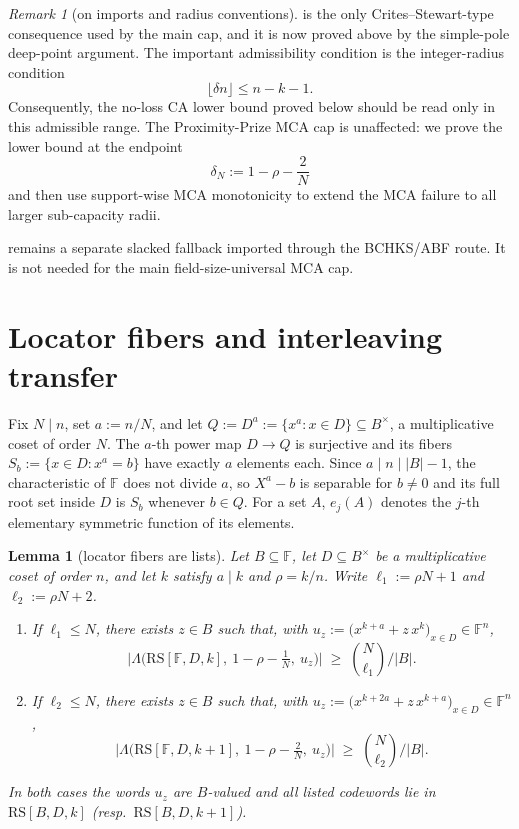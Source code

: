 \documentclass[11pt]{article}
\newtheorem{lemma}[theorem]{Lemma}
\theoremstyle{definition}
\theoremstyle{remark}
\newtheorem{remark}[theorem]{Remark}
\newcommand{\F}{\mathbb{F}}
\newcommand{\B}{B}
\newcommand{\RS}{\mathrm{RS}}
\newcommand{\Lst}{\Lambda}
\begin{document}
\begin{remark}[on imports and radius conventions]\label{rem:import}
 is the only Crites--Stewart-type consequence used by the main cap, and it is now proved above by the simple-pole deep-point argument.  The important admissibility condition is the integer-radius condition
\[
        \lfloor \delta n\rfloor \le n-k-1 .
\]
Consequently, the no-loss CA lower bound proved below should be read only in this admissible range. The Proximity-Prize MCA cap is unaffected: we prove the lower bound at the endpoint
\[
        \delta_N:=1-\rho-\frac2N
\]
and then use support-wise MCA monotonicity to extend the MCA failure to all larger sub-capacity radii.

 remains a separate slacked fallback imported through the BCHKS/ABF route. It is not needed for the main field-size-universal MCA cap.
\end{remark}

\section{Locator fibers and interleaving transfer}\label{sec:fiber}

Fix $N\mid n$, set $a:=n/N$, and let $Q:=D^{a}:=\{x^a:x\in D\}\subseteq\B^\times$, a multiplicative coset of order $N$. The $a$-th power map $D\to Q$ is surjective and its fibers $S_b:=\{x\in D:x^a=b\}$ have exactly $a$ elements each. Since $a\mid n\mid|\B|-1$, the characteristic of $\F$ does not divide $a$, so $X^a-b$ is separable for $b\ne0$ and its full root set inside $D$ is $S_b$ whenever $b\in Q$. For a set $A$, $e_j(A)$ denotes the $j$-th elementary symmetric function of its elements.

\begin{lemma}[locator fibers are lists]\label{lem:fiber}
Let $\B\subseteq\F$, let $D\subseteq\B^\times$ be a multiplicative coset of order $n$, and let $k$ satisfy $a\mid k$ and $\rho=k/n$. Write $\ell_1:=\rho N+1$ and $\ell_2:=\rho N+2$.
\begin{enumerate}[label=\textup{(\roman*)}]
\item If $\ell_1\le N$, there exists $z\in\B$ such that, with $u_z:=\bigl(x^{k+a}+z\,x^{k}\bigr)_{x\in D}\in\F^n$,
\[
\bigl|\Lst\bigl(\RS[\F,D,k],\ 1-\rho-\tfrac1N,\ u_z\bigr)\bigr|\;\ge\;\binom{N}{\ell_1}\Big/|\B| .
\]
\item If $\ell_2\le N$, there exists $z\in\B$ such that, with $u_z:=\bigl(x^{k+2a}+z\,x^{k+a}\bigr)_{x\in D}\in\F^n$,
\[
\bigl|\Lst\bigl(\RS[\F,D,k+1],\ 1-\rho-\tfrac2N,\ u_z\bigr)\bigr|\;\ge\;\binom{N}{\ell_2}\Big/|\B| .
\]
\end{enumerate}
In both cases the words $u_z$ are $\B$-valued and all listed codewords lie in $\RS[\B,D,k]$ \textup(resp.\ $\RS[\B,D,k+1]$\textup).
\end{lemma}
\end{document}

